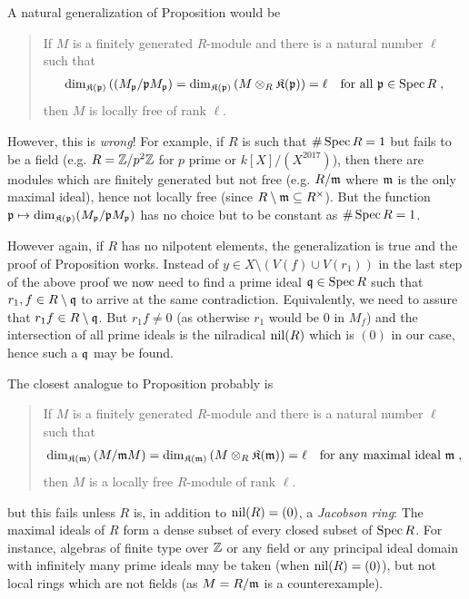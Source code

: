 \documentclass[a4paper,parskip=half,numbers=enddot, DIV=12]{scrreprt}
\begin{document}
\begin{rem*}
    \begin{alphanumerate}
      \item 
        A natural generalization of Proposition  would be
        \begin{quote}
            If $M$ is a finitely generated $R$-module and there is a natural number $\ell$ such that
            \begin{align*}
            	\dim_{\mathfrak{K}(\mathfrak{p})}\left((M_{\mathfrak{p}}/\mathfrak{p} M_{\mathfrak{p}}\right) = \dim_{\mathfrak{K}(\mathfrak{p})}\left( M \otimes_R \mathfrak{K}(\mathfrak{p})\right)=\ell\quad\text{for all }\mathfrak{p}\in \operatorname{Spec} R\;,
            \end{align*}
             then $M$ is locally free of rank $\ell$.
        \end{quote}
        However, this is \emph{wrong}! For example, if $R$ is such that $\#\operatorname{Spec} R=1$ but fails to be a field (e.g. $R=\mathbb{Z}/p^2\mathbb{Z}$ for $p$ prime or $k[X]/(X^{2017})$), then there are modules which are finitely generated but not free (e.g. $R/\mathfrak{m}$ where $\mathfrak{m}$ is the only maximal ideal), hence not locally free (since $R\setminus \mathfrak{m}\subseteq R^\times$). But the function $\mathfrak{p}\mapsto \dim_{\mathfrak{K}(\mathfrak{p})}(M_{\mathfrak{p}}/\mathfrak{p} M_{\mathfrak{p}})$ has no choice but to be constant as $\#\operatorname{Spec} R = 1$. 
        
        However again,  if $R$ has no nilpotent elements, the generalization is true and the proof of Proposition  works. Instead of $y\in X\setminus(V(f)\cup V(r_1))$ in the last step of the above proof we now need to find a prime ideal $\mathfrak{q}\in\operatorname{Spec} R$ such that $r_1,f\in R\setminus\mathfrak{q}$ to arrive at the same contradiction. Equivalently, we need to assure that $r_1f\in R\setminus\mathfrak{q}$. But $r_1f\not=0$ (as otherwise $r_1$ would be $0$ in $M_f$) and the intersection of all prime ideals is the nilradical $\operatorname{nil}(R)$ which is $(0)$ in our case, hence such a $\mathfrak{q}$ may be found.
      \item 
        The closest analogue to Proposition  probably is
        \begin{quote}
            If $M$ is a finitely generated $R$-module and there is a natural number $\ell$ such that 
            \begin{align*}
            	\dim_{\mathfrak{K}(\mathfrak{m})} \left(M/\mathfrak{m} M\right) = \dim_{\mathfrak{K}(\mathfrak{m})} \left(M\otimes_R \mathfrak{K}(\mathfrak{m})\right) = \ell\quad\text{for any maximal ideal }\mathfrak{m}\;, 
            \end{align*}
            then $M$ is a locally free $R$-module of rank $\ell$.
        \end{quote}
        but this fails unless $R$ is, in addition to $\operatorname{nil}(R) = (0)$, a \emph{Jacobson ring}: The maximal ideals of $R$ form a dense subset of every closed subset of $\operatorname{Spec} R$. For instance, algebras of finite type over $\mathbb{Z}$ or any field or any principal ideal domain with infinitely many prime ideals may be taken (when $\operatorname{nil}(R) = (0)$), but not local rings which are not fields (as $M=R/\mathfrak{m}$ is a counterexample).

    \end{alphanumerate}
\end{rem*}
\end{document}
